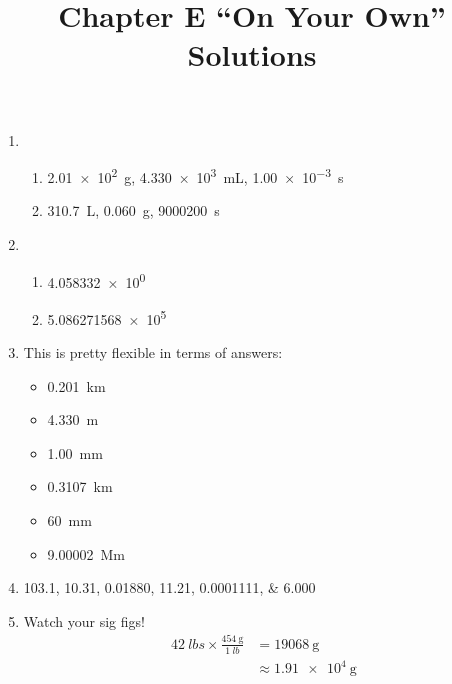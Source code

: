 \documentclass[11pt,letterpaper]{article}
\title{Chapter E ``On Your Own'' Solutions}
\begin{document}
\begin{center}
	\bfseries
	\Large
	\thetitle
\end{center}

\begin{enumerate}
	\item \begin{enumerate}
		\item \SI{2.01e2}{\gram}, 
			\SI{4.330e3}{\milli\liter}, 
			\SI{1.00e-3}{\second}
		\item \SI{310.7}{\liter}, 
			\SI{0.060}{\gram},
			\SI{9000200}{\second}
	\end{enumerate}

\item \begin{enumerate}
	\item \num{4.058332e0}
	\item \num{5.086271568e5}
\end{enumerate}

	\item This is pretty flexible in terms of answers:
		\begin{itemize}
			\item \SI{0.201}{\kilo\meter}
			\item \SI{4.330}{\meter}
			\item \SI{1.00}{\milli\meter}
			\item \SI{0.3107}{\kilo\meter}
			\item \SI{60}{\milli\meter}
			\item \SI{9.00002}{\mega\meter}
		\end{itemize}

	\item \numlist{103.1;10.31;0.01880;11.21;0.0001111;6.000}

	\item Watch your sig figs!
		\begin{align*}
			\SI{42}{lbs} \times \frac{\SI{454}{\gram}}{\SI{1}{lb}}
			&= \SI{19068}{\gram} \\
			&\approx \boxed{\SI{1.91e4}{\gram}}
		\end{align*}
\end{enumerate}
\end{document}

